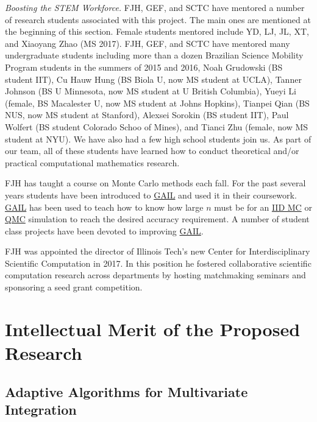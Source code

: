 \documentclass[11pt]{NSFamsart}
\newcommand{\GAIL}{\hyperlink{GAILlink}{GAIL}\xspace}
\newcommand{\QMC}{\hyperlink{QMClink}{QMC}\xspace}
\newcommand{\IIDMC}{\hyperlink{IIDMClink}{IID MC}\xspace}
\begin{document}
\emph{Boosting the STEM Workforce.} FJH, GEF, and SCTC have mentored a number of 
research students associated with this project.  The main ones are mentioned at the beginning of 
this section.  Female students mentored include YD, LJ, JL, XT, and Xiaoyang Zhao (MS 2017).   FJH, GEF, and SCTC have mentored many undergraduate students including more than a dozen 
Brazilian Science Mobility Program students in the summers of 2015 and 2016, Noah Grudowski (BS student IIT), Cu Hauw Hung (BS Biola U, now MS student at UCLA), Tanner Johnson (BS U Minnesota, now MS student at U British Columbia), Yueyi Li (female, BS Macalester U, now MS student at Johns Hopkins), Tianpei Qian (BS NUS, now MS student at Stanford), Alexsei Sorokin (BS student IIT), Paul Wolfert (BS student Colorado Schoo of Mines), and 
Tianci Zhu (female, now MS student at NYU).  We have also had a few high school students join us. As part of our team, all of
these students have learned how to conduct theoretical and/or practical computational mathematics research.

FJH has taught a course on Monte Carlo methods each fall.  For the past several years students 
have been introduced to \GAIL and used it in their coursework.  \GAIL has been used to teach how 
to know how large $n$ must be for an \IIDMC or \QMC simulation to reach the desired accuracy 
requirement.  A number of student class projects have been devoted to improving \GAIL.

FJH was appointed the director of Illinois Tech's new Center for Interdisciplinary 
Scientific Computation in 2017.  In this position he fostered collaborative scientific computation 
research across departments by hosting matchmaking seminars and sponsoring a seed grant 
competition. %




\section{Intellectual Merit of the Proposed Research} \label{sec:Proposed}


\subsection{Adaptive Algorithms for Multivariate Integration}\label{SectMultiInt}
\end{document}
